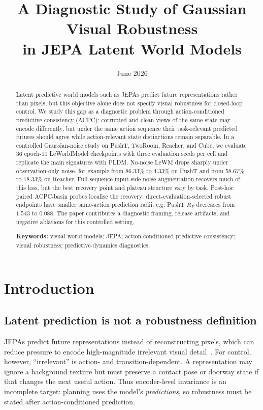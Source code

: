 \documentclass[10pt]{article}
\title{\textbf{A Diagnostic Study of Gaussian Visual Robustness\\in JEPA Latent World Models}}
\author{\arxivauthors}
\date{June 2026}
\begin{document}
\maketitle

\begin{abstract}
Latent predictive world models such as JEPAs predict future representations rather than pixels, but this objective alone does not specify visual robustness for closed-loop control. We study this gap as a diagnostic problem through action-conditioned predictive consistency (ACPC): corrupted and clean views of the same state may encode differently, but under the same action sequence their task-relevant predicted futures should agree while action-relevant state distinctions remain separable. In a controlled Gaussian-noise study on PushT, TwoRoom, Reacher, and Cube, we evaluate 36 epoch-10 LeWorldModel checkpoints with three evaluation seeds per cell and replicate the main signatures with PLDM. No-noise LeWM drops sharply under observation-only noise, for example from $86.33\%$ to $4.33\%$ on PushT and from $58.67\%$ to $18.33\%$ on Reacher. Full-sequence input-side noise augmentation recovers much of this loss, but the best recovery point and plateau structure vary by task. Post-hoc paired ACPC-basin probes localise the recovery: direct-evaluation-selected robust endpoints have smaller same-action prediction radii, e.g. PushT $R_F$ decreases from $1.543$ to $0.088$. The paper contributes a diagnostic framing, release artifacts, and negative ablations for this controlled setting.

\smallskip
\noindent\textbf{Keywords:} visual world models; JEPA; action-conditioned predictive consistency; visual robustness; predictive-dynamics diagnostics.
\end{abstract}

\section{Introduction}\label{sec:intro}

\subsection{Latent prediction is not a robustness definition}\label{sec:intro-heuristic}

JEPAs predict future representations instead of reconstructing pixels, which can reduce pressure to encode high-magnitude irrelevant visual detail~\cite{assran2023ijepa,bardes2024vjepa,vanassel2025jointembeddingreconstruction}. For control, however, ``irrelevant'' is action- and transition-dependent. A representation may ignore a background texture but must preserve a contact pose or doorway state if that changes the next useful action. Thus encoder-level invariance is an incomplete target: planning uses the model's \emph{predictions}, so robustness must be stated after action-conditioned prediction.
\end{document}
